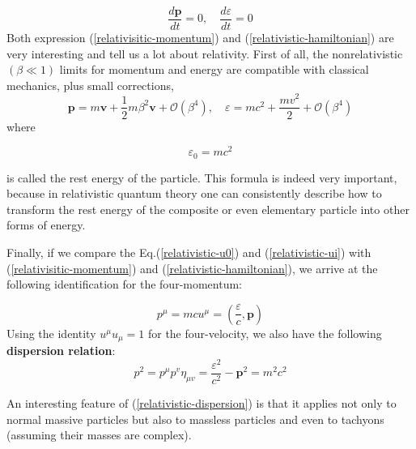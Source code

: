 \begin{equation}
\frac{d \mathbf{p}}{d t}=0, \quad \frac{d \varepsilon}{d t}=0
\end{equation}
Both expression (\ref{relativisitic-momentum}) and (\ref{relativistic-hamiltonian}) are very interesting and tell us a lot about relativity. First of all, the nonrelativistic $(\beta \ll 1)$ limits for momentum and energy are compatible with classical mechanics, plus small corrections,
\begin{equation}
\mathbf{p}=m \mathbf{v}+\frac{1}{2} m \beta^{2} \mathbf{v}+\mathcal{O}\left(\beta^{4}\right), \quad \varepsilon=m c^{2}+\frac{m v^{2}}{2}+\mathcal{O}\left(\beta^{4}\right)
\end{equation}
where
\begin{qt}
    $$\varepsilon_0=mc^2$$
\end{qt}
is called the rest energy of the particle. This formula is
indeed very important, because in relativistic quantum theory one can consistently describe how to transform the rest energy of the composite or even elementary particle into other forms of energy.

Finally, if we compare the Eq.(\ref{relativistic-u0}) and (\ref{relativistic-ui}) with (\ref{relativisitic-momentum}) and (\ref{relativistic-hamiltonian}), we arrive at the following identification for the four-momentum:
\begin{qt}
    \begin{equation}
p^{\mu}=m c u^{\mu}=\left(\frac{\varepsilon}{c}, \mathbf{p}\right)
\end{equation}
Using the identity $u^{\mu} u_{\mu}=1$ for the four-velocity, we also have the following \textbf{dispersion relation}:
\begin{equation}
p^{2}=p^{\mu} p^{v} \eta_{\mu v}=\frac{\varepsilon^{2}}{c^{2}}-\mathbf{p}^{2}=m^{2} c^{2}
\label{relativistic-dispersion}
\end{equation}
\end{qt}
An interesting feature of (\ref{relativistic-dispersion}) is that it applies not only to normal massive particles but also to massless particles and even to tachyons (assuming their masses
are complex).

